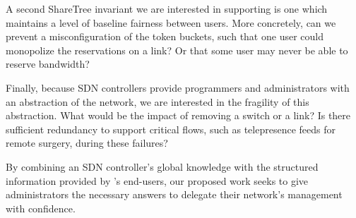 A second ShareTree invariant we are interested in supporting is one which
maintains a level of baseline fairness between users. More concretely, can
we prevent a misconfiguration of the token buckets, such that one user could
monopolize the reservations on a link? Or that some user may never be able
to reserve bandwidth?

Finally, because SDN controllers provide programmers and administrators
with an abstraction of the network, we are interested in the fragility of this
abstraction. What would be the impact of removing a switch or a link? Is there
sufficient redundancy to support critical flows, such as telepresence feeds
for remote surgery, during these failures?

By combining an SDN controller's global knowledge with the structured
information provided by \sys's end-users, our proposed work seeks to give
administrators the necessary answers to delegate their network's management
with confidence.

\begin{comment}
Several previous works have explored how to prevent these configurations in 
non-participatory networks, including:
* Margrave: 
http://www.cs.brown.edu/~sk/Publications/Papers/Published/nbfdk-margrave-firewal
l/paper.pdf
* Header Space Analysis: 
https://www.usenix.org/system/files/conference/nsdi12/nsdi12-final8.pdf
* Feamster's RCC: http://nms.csail.mit.edu/papers/rcc-nsdi-camera.pdf

and could be applied to detecting bad configurations at the PolicyTree-level. 
When applied in an online fashion (that is, when a new rule is considered for 
insertion), these tools provide a type of "change-impact analysis" -- that is, 
does the impact of the change I just made agree with my intent? The key 
challenge here is to capture the user's intent in some reasonable fashion.

It's about 
running a tiny version of that impact analysis tool in the frontend to 
determine if we should accept the proposed change.  One of the cool things 
about `strict` is that it helps when there are many concurrent updates 
happening. If I read the state of the PolicyTree, decide on a rule, and set it 
with `strict`, I know that it will apply exactly as I intended. However, if 
there are have been updates which would have affected it, then the change is 
rejected; this is why `partial` may better because it will be applied either 
way.
\end{comment}

